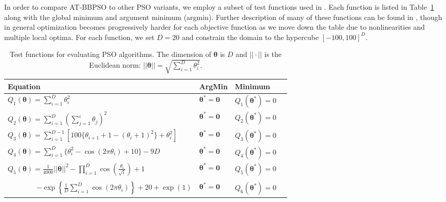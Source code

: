 \documentclass[cmbright]{staauth}
\begin{document}
In order to compare AT-BBPSO to other PSO variants, we employ a subset of test functions used in \cite{hsieh2010modified}. Each function is listed in Table~\ref{tab:testfuns} along with the global minimum and argument minimum (argmin). Further description of many of these functions can be found in \cite{clerc2010particle}, though in general optimization becomes progressively harder for each objective function as we move down the table due to nonlinearities and multiple local optima. For each function, we set $D=20$ and constrain the domain to the hypercube $[-100, 100]^D$.

\begin{table}[p]
\centering
\begin{tabular}{llll}
 Equation & ArgMin & Minimum \\\hline
 $Q_1(\bm{\theta}) = \sum_{i=1}^D\theta_i^2$ & $\bm{\theta}^* = \bm{0}$ & $Q_1(\bm{\theta}^*) = 0$  \\
 $Q_2(\bm{\theta}) = \sum_{i=1}^D\left(\sum_{j=1}^i \theta_j\right)^2 $ & $\bm{\theta}^* = \bm{0}$ & $Q_2(\bm{\theta}^*) = 0$ \\
 $Q_3(\bm{\theta}) = \sum_{i=1}^{D-1}\left[100\{\theta_{i+1} + 1 - (\theta_i + 1)^2\} + \theta_i^2\right]$ & $\bm{\theta}^* = \bm{0}$ & $Q_3(\bm{\theta}^*) = 0$ \\
 $Q_4(\bm{\theta}) = \sum_{i=1}^D\{\theta_i^2 - \cos(2\pi \theta_i) + 10\} - 9D$ & $\bm{\theta}^*=\bm{0}$ & $Q_4(\bm{\theta}^*) = 0$ \\
 $Q_5(\bm{\theta}) = \frac{1}{4000}||\bm{\theta}||^2 - \prod_{i=1}^D\cos\left(\frac{\theta_i}{\sqrt{i}}\right) + 1$ & $\bm{\theta}^* = \bm{0}$ & $Q_5(\bm{\theta}^*) = 0$ \\
 \shortstack[l]{$Q_6(\bm{\theta}) = -20\exp\left(-0.2\sqrt{\frac{1}{D}||\bm{\theta}||}\right)$ \\ \ \ \ \ \ \ \ \ $- \exp\left\{\frac{1}{D}\sum_{i=1}^D\cos(2\pi \theta_i)\right\} + 20 + \exp(1)$} & $\bm{\theta}^* = \bm{0}$ & $Q_6(\bm{\theta}^*) = 0$ \\\hline
\end{tabular}
\caption{Test functions for evaluating PSO algorithms. The dimension of $\bm{\theta}$ is $D$ and $||\cdot||$ is the Euclidean norm: $||\bm{\theta}|| = \sqrt{\sum_{i=1}^D\theta_i^2}$.}
\label{tab:testfuns}
\end{table}
\end{document}
